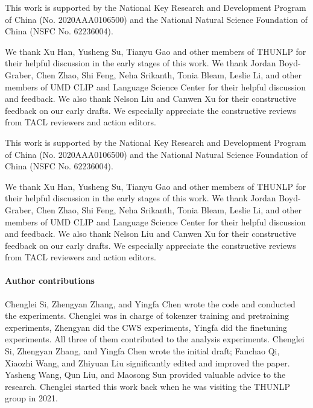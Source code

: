 This work is supported by the National Key Research and Development Program of China (No. 2020AAA0106500) and the National Natural Science Foundation of China (NSFC No. 62236004).

We thank Xu Han, Yusheng Su, Tianyu Gao and other members of THUNLP for their helpful discussion in the early stages of this work. We thank Jordan Boyd-Graber, Chen Zhao, Shi Feng, Neha Srikanth, Tonia Bleam, Leslie Li, and other members of UMD CLIP and Language Science Center for their helpful discussion and feedback. We also thank Nelson Liu and Canwen Xu for their constructive feedback on our early drafts. 
We especially appreciate the constructive reviews from TACL reviewers and action editors. 

This work is supported by the National Key Research and Development Program of China (No. 2020AAA0106500) and the National Natural Science Foundation of China (NSFC No. 62236004).

We thank Xu Han, Yusheng Su, Tianyu Gao and other members of THUNLP for their helpful discussion in the early stages of this work. We thank Jordan Boyd-Graber, Chen Zhao, Shi Feng, Neha Srikanth, Tonia Bleam, Leslie Li, and other members of UMD CLIP and Language Science Center for their helpful discussion and feedback. We also thank Nelson Liu and Canwen Xu for their constructive feedback on our early drafts. 
We especially appreciate the constructive reviews from TACL reviewers and action editors. 

\paragraph{Author contributions} Chenglei Si, Zhengyan Zhang, and Yingfa Chen wrote the code and conducted the experiments. Chenglei was in charge of tokenzer training and pretraining experiments, Zhengyan did the CWS experiments, Yingfa did the finetuning experiments. All three of them contributed to the analysis experiments.
Chenglei Si, Zhengyan Zhang, and Yingfa Chen wrote the initial draft; Fanchao Qi, Xiaozhi Wang, and Zhiyuan Liu significantly edited and improved the paper.
Yasheng Wang, Qun Liu, and Maosong Sun provided valuable advice to the research. Chenglei started this work back when he was visiting the THUNLP group in 2021. 